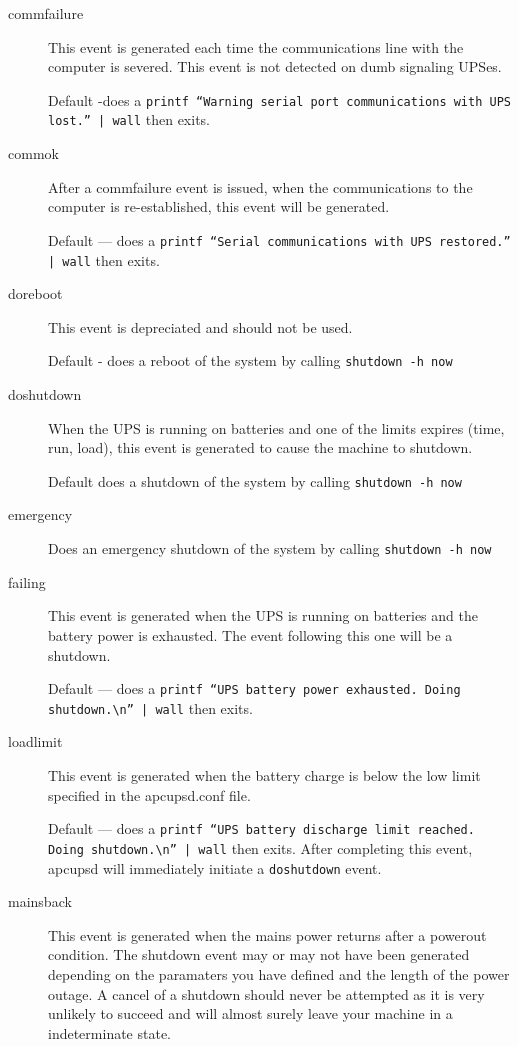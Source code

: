 {{{{{{\begin{description}
\item [commfailure]
   This event is generated each time the communications line with the computer is
severed. This event is not detected on dumb signaling UPSes.  

Default -does a {\tt printf ``Warning serial port communications with UPS
lost.'' | wall} then exits.  

\item [commok]
   After a commfailure event is issued, when the communications to the computer
is re-established, this event will be generated.  

Default {---} does a {\tt printf ``Serial communications with UPS restored.''
| wall} then exits.  

\item [doreboot]
   This event is depreciated and should not be used.  

Default - does a reboot of the system by calling {\tt shutdown -h now}  

\item [doshutdown]
   When the UPS is running on batteries and one of the limits expires (time, run,
load), this event is generated to cause the machine to shutdown.  

Default does a shutdown of the system by calling {\tt shutdown -h now}  

\item [emergency]
   Does an emergency shutdown of the system by calling {\tt shutdown -h now}  

\item [failing]
   This event is generated when the UPS is running on batteries and the battery
power is exhausted. The event following this one will be a shutdown.  

Default {---} does a {\tt printf ``UPS battery power exhausted. Doing
shutdown.\textbackslash{}n'' | wall} then exits.  

\item [loadlimit]
   This event is generated when the battery charge is below the low limit
specified in the apcupsd.conf file.  

Default {---} does a {\tt printf ``UPS battery discharge limit reached. Doing
shutdown.\textbackslash{}n'' | wall} then exits.  After completing this event,
apcupsd will immediately initiate a {\tt doshutdown} event.  

\item [mainsback]
   This event is generated when the mains power returns after a powerout
condition. The shutdown event may or may not have been generated depending on
the paramaters you have defined and the length of the power outage. A cancel
of a shutdown should never be attempted as it is very unlikely to succeed and
will almost surely leave your machine in a indeterminate state.  


\end{description}}}}}}}
